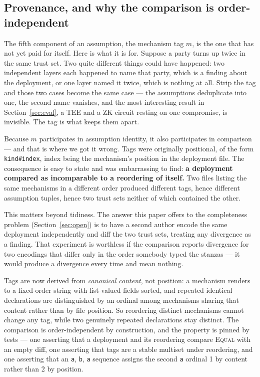 \documentclass[11pt]{article}
\begin{document}
\subsection{Provenance, and why the comparison is order-independent}
\label{sec:orderindep}

The fifth component of an assumption, the mechanism tag $m$, is the one that
has not yet paid for itself. Here is what it is for. Suppose a party turns up
twice in the same trust set. Two quite different things could have happened:
two independent layers each happened to name that party, which is a finding
about the deployment, or one layer named it twice, which is nothing at all.
Strip the tag and those two cases become the same case --- the assumptions
deduplicate into one, the second name vanishes, and the most interesting
result in Section~\ref{sec:eval}, a TEE and a ZK circuit resting on one
compromise, is invisible. The tag is what keeps them apart.

Because $m$ participates in assumption identity, it also participates in
comparison --- and that is where we got it wrong. Tags were originally
positional, of the form \texttt{kind\#index}, index being the mechanism's
position in the deployment file. The consequence is easy to state and was
embarrassing to find: \textbf{a deployment compared as incomparable to a
reordering of itself.} Two files listing the same mechanisms in a different
order produced different tags, hence different assumption tuples, hence two
trust sets neither of which contained the other.

This matters beyond tidiness. The answer this paper offers to the
completeness problem (Section~\ref{sec:open}) is to have a second author
encode the same deployment independently and diff the two trust sets, treating
any divergence as a finding. That experiment is worthless if the comparison
reports divergence for two encodings that differ only in the order somebody
typed the stanzas --- it would produce a divergence every time and mean
nothing.

Tags are now derived from \emph{canonical content}, not position: a mechanism
renders to a fixed-order string with list-valued fields sorted, and repeated
identical declarations are distinguished by an ordinal among mechanisms
sharing that content rather than by file position. So reordering distinct
mechanisms cannot change any tag, while two genuinely repeated declarations
stay distinct. The comparison is order-independent by construction, and the
property is pinned by tests --- one asserting that a deployment and its
reordering compare \textsc{Equal} with an empty diff, one asserting that tags
are a stable multiset under reordering, and one asserting that an
\texttt{a}, \texttt{b}, \texttt{a} sequence assigns the second \texttt{a}
ordinal 1 by content rather than 2 by position.
\end{document}
